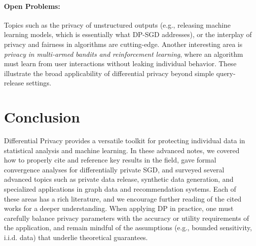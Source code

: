 \documentclass[11pt]{article}
\theoremstyle{remark}
\theoremstyle{definition}
\theoremstyle{plain}
\begin{document}
\paragraph{Open Problems:} Topics such as the privacy of unstructured outputs (e.g., releasing machine learning models, which is essentially what DP-SGD addresses), or the interplay of privacy and fairness in algorithms are cutting-edge. Another interesting area is \emph{privacy in multi-armed bandits and reinforcement learning}, where an algorithm must learn from user interactions without leaking individual behavior. These illustrate the broad applicability of differential privacy beyond simple query-release settings.

\section*{Conclusion}

Differential Privacy provides a versatile toolkit for protecting individual data in statistical analysis and machine learning. In these advanced notes, we covered how to properly cite and reference key results in the field, gave formal convergence analyses for differentially private SGD, and surveyed several advanced topics such as private data release, synthetic data generation, and specialized applications in graph data and recommendation systems. Each of these areas has a rich literature, and we encourage further reading of the cited works for a deeper understanding. When applying DP in practice, one must carefully balance privacy parameters with the accuracy or utility requirements of the application, and remain mindful of the assumptions (e.g., bounded sensitivity, i.i.d. data) that underlie theoretical guarantees.
\end{document}
